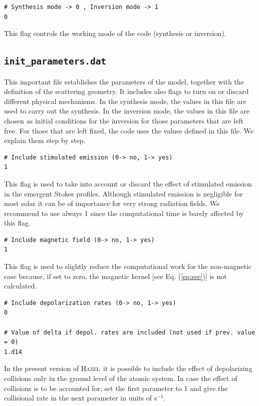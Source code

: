 \documentclass[12pt]{article}
\def\H{\textsc{Hazel}}
\begin{document}
\begin{verbatim}
# Synthesis mode -> 0 , Inversion mode -> 1
0
\end{verbatim}
This flag controls the working mode of the code (synthesis or inversion).

\subsection{\texttt{init\_parameters.dat}}
\label{sec:init_parameters}
This important file establishes the parameters
of the model, together with the definition of the scattering geometry. It includes also
flags to turn on or discard different physical mechanisms. In the synthesis mode, the values in
this file are used to carry out the synthesis. In the inversion mode, the values in 
this file are chosen as initial conditions for the inversion for those parameters that
are left free. For those that are left fixed, the code uses the values defined in this
file. We explain them step by step.

\begin{verbatim}
# Include stimulated emission (0-> no, 1-> yes)
1
\end{verbatim}
This flag is used to take into account or discard the effect of stimulated emission in the emergent
Stokes profiles. Although stimulated emission is negligible for most solar 
it can be of importance for very strong radiation 
fields. We recommend to use always 1 since the computational time is barely affected by
this flag.

\begin{verbatim}
# Include magnetic field (0-> no, 1-> yes)
1
\end{verbatim}
This flag is used to slightly reduce the computational work for the non-magnetic case because,
if set to zero, the magnetic kernel [see Eq. (\ref{eq:see})] is not calculated.

\begin{verbatim}
# Include depolarization rates (0-> no, 1-> yes)
0

# Value of delta if depol. rates are included (not used if prev. value = 0)
1.d14
\end{verbatim}
In the present version of \H\ it is possible to include the effect of depolarizing collisions only in the ground
level of the atomic system. In case the effect of collisions is to be accounted for, set 
the first parameter to 1 and give the collisional
rate in the next parameter in units of s$^{-1}$.
\end{document}
